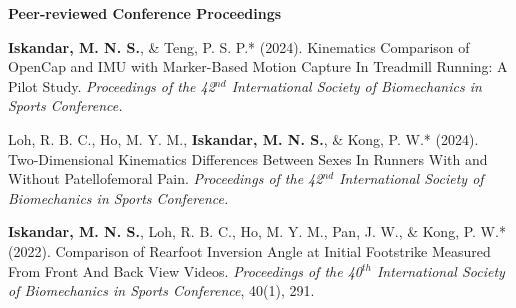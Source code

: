 \documentclass[../main.tex]{subfiles}
\begin{document}
        \textbf{Peer-reviewed Conference Proceedings}
        \def\labelprefix{C}
        \begin{etaremune}
            \item\label{conference: isbs2024opencap} {\textbf{Iskandar, M. N. S.}, \& Teng, P. S. P.* (2024). Kinematics Comparison of OpenCap and IMU with Marker-Based Motion Capture In Treadmill Running: A Pilot Study. \textit{Proceedings of the 42$^{nd}$ International Society of Biomechanics in Sports Conference.} \href{https://commons.nmu.edu/isbs/vol42/iss1/136/}{\faFilePdfO} \href{https://github.com/Shahril-Iskandar/publication-conference-validation}{\faGithub}}
        
            \item\label{conference: isbs2024raystudy} Loh, R. B. C., Ho, M. Y. M., {\textbf{Iskandar, M. N. S.}, \& Kong, P. W.* (2024). Two-Dimensional Kinematics Differences Between Sexes In Runners With and Without Patellofemoral Pain. \textit{Proceedings of the 42$^{nd}$ International Society of Biomechanics in Sports Conference.}} \href{https://commons.nmu.edu/isbs/vol42/iss1/124/}{\faFilePdfO}
            
            \item\label{conference: isbs2022} {\textbf{Iskandar, M. N. S.}, Loh, R. B. C., Ho, M. Y. M., Pan, J. W., \& Kong, P. W.* (2022). Comparison of Rearfoot Inversion Angle at Initial Footstrike Measured From Front And Back View Videos. \textit{Proceedings of the 40$^{th}$ International Society of Biomechanics in Sports Conference}, 40(1), 291. \href{https://commons.nmu.edu/isbs/vol40/iss1/70/}{\faFilePdfO}}
        \end{etaremune}
\end{document}
